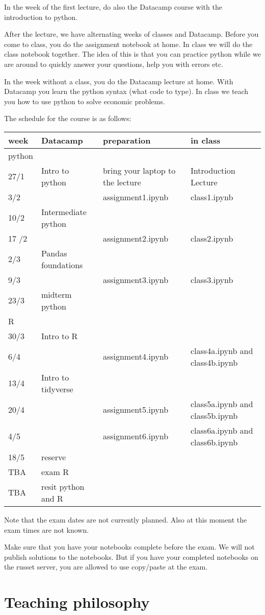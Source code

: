 \documentclass[]{book}
\begin{document}
In the week of the first lecture, do also the Datacamp course with the introduction to python.

After the lecture, we have alternating weeks of classes and Datacamp. Before you come to class, you do the assignment notebook at home. In class we will do the class notebook together. The idea of this is that you can practice python while we are around to quickly answer your questions, help you with errors etc.

In the week without a class, you do the Datacamp lecture at home. With Datacamp you learn the python syntax (what code to type). In class we teach you how to use python to solve economic problems.

The schedule for the course is as follows:

\begin{longtable}[]{@{}llll@{}}
\toprule
week & Datacamp & preparation & in class\tabularnewline
\midrule
\endhead
python & & &\tabularnewline
27/1 & Intro to python & bring your laptop to the lecture & Introduction Lecture\tabularnewline
3/2 & & assignment1.ipynb & class1.ipynb\tabularnewline
10/2 & Intermediate python & &\tabularnewline
17 /2 & & assignment2.ipynb & class2.ipynb\tabularnewline
2/3 & Pandas foundations & &\tabularnewline
9/3 & & assignment3.ipynb & class3.ipynb\tabularnewline
23/3 & midterm python & &\tabularnewline
R & & &\tabularnewline
30/3 & Intro to R & &\tabularnewline
6/4 & & assignment4.ipynb & class4a.ipynb and class4b.ipynb\tabularnewline
13/4 & Intro to tidyverse & &\tabularnewline
20/4 & & assignment5.ipynb & class5a.ipynb and class5b.ipynb\tabularnewline
4/5 & & assignment6.ipynb & class6a.ipynb and class6b.ipynb\tabularnewline
18/5 & reserve & &\tabularnewline
TBA & exam R & &\tabularnewline
TBA & resit python and R & &\tabularnewline
\bottomrule
\end{longtable}

Note that the exam dates are not currently planned. Also at this moment the exam times are not known.

Make sure that you have your notebooks complete before the exam. We will not publish solutions to the notebooks. But if you have your completed notebooks on the russet server, you are allowed to use copy/paste at the exam.

\hypertarget{teaching-philosophy}{%
\section{Teaching philosophy}\label{teaching-philosophy}}
\end{document}
